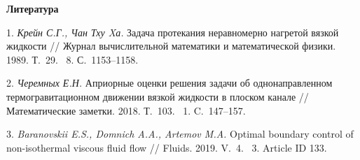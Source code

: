 \smallskip \centerline {\bf Литература} \nopagebreak

1. {\it Крейн С.Г., Чан Тху Xа.} Задача протекания неравномерно нагретой вязкой жидкости // Журнал вычислительной математики и математической физики. 1989. Т.~29. \No~8. С.~1153--1158.

2. {\it Черемных Е.Н.} Априорные оценки решения задачи об однонаправленном термогравитационном движении вязкой жидкости в плоском канале // Математические заметки. 2018. Т.~103. \No~1. C.~147--157.

3. {\it Baranovskii E.S., Domnich A.A., Artemov M.A.} Optimal boundary control of non-isothermal viscous fluid flow // Fluids. 2019. V.~4. \No~3. Article ID 133.
